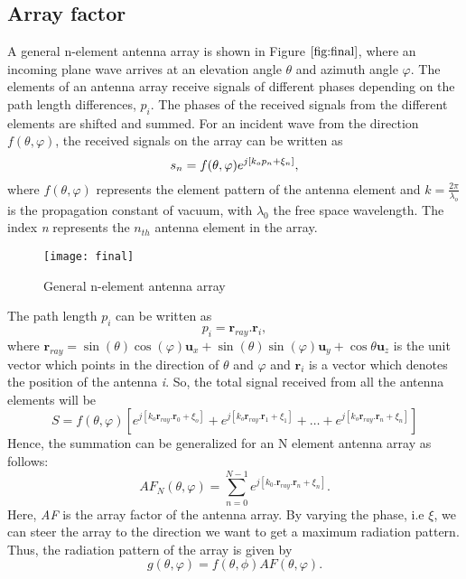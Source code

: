 \documentclass[titlepage]{article}
\begin{document}
\subsection{Array factor}
A general n-element antenna array is shown in Figure $\ref{fig:final}$, where an incoming plane wave arrives at an elevation angle $\theta$ and azimuth angle $\varphi$. The elements of an antenna array receive signals of different phases depending on the path length differences, $p_i$. The phases of the received signals from the different elements are shifted and summed. For an incident wave from the direction $f(\theta , \varphi)$, the received signals on the array can be written as
\begin{equation}
\centering
s_n=f(\theta,\varphi)e^{j[k_op_n + \xi_n]},
\end{equation}
where $f(\theta,\varphi)$ represents the element pattern of the antenna element and $k=\frac{2\pi}{\lambda_o}$ is the propagation constant of vacuum, with $\lambda_0$ the free space wavelength. The index \emph{n} represents the $n_{th}$ antenna element in the array.
\begin{figure}[!hbp]
\centering
\texttt{[image: final]}
\caption{General n-element antenna array}
\label{fig:final}
\end{figure}
The path length $p_i$ can be written as
\begin{equation}
    p_i=\textbf{r}_{ray}.\textbf{r}_i  ,
\end{equation}
where $\textbf{r}_{ray}=\sin(\theta) \cos(\varphi) \textbf{u}_x+\sin(\theta) \sin(\varphi)\textbf{u}_y+\cos\theta \textbf{u}_z$ is the unit vector which points in the direction of $\theta$ and $\varphi$ and $\textbf{r}_i$ is a vector which denotes the position of the antenna \emph{i}. So, the total signal received from all the antenna elements will be
\begin{equation}
    S=f(\theta,\varphi)[e^{j[k_o\textbf{r}_{ray}.\textbf{r}_0 + \xi_o]}+e^{j[k_o\textbf{r}_{ray}.\textbf{r}_1 + \xi_1]}+ \ldots + e^{j[k_o\textbf{r}_{ray}.\textbf{r}_n + \xi_n]}]
\end{equation}
Hence, the summation can be generalized  for an N element antenna array as follows:
\begin{equation}
    AF_{N}(\theta , \varphi)= \sum_{n=0}^{N-1}e^{j[k_0.\textbf{r}_{ray}.\textbf{r}_n +\xi_n]} .
\end{equation}
Here, \emph{AF} is the array factor of the antenna array. By varying the phase, i.e $\xi$, we can steer the array to the direction we want to get a maximum radiation pattern.
Thus, the radiation pattern of the array is given by
\begin{equation}
    g(\theta,\varphi)=f(\theta,\phi)AF(\theta,\varphi).
\end{equation}
\end{document}
